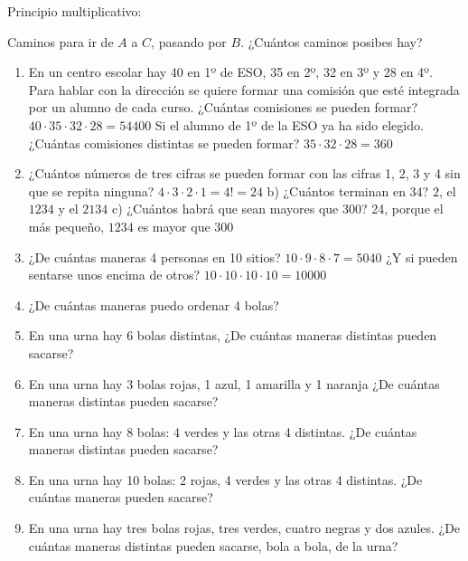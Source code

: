 Principio multiplicativo:

Caminos para ir de $A$ a $C$, pasando por $B$. ¿Cuántos caminos posibes hay? 

\begin{enumerate}
	\item En un centro escolar hay 40 en 1º de ESO, 35 en 2º, 32 en 3º y 28 en 4º. Para hablar con la dirección se quiere formar una comisión que esté integrada por un alumno de cada curso. ¿Cuántas comisiones se pueden formar?
	{$40·35·32·28=54400$}
	\subitem Si el alumno de 1º de la ESO ya ha sido elegido. ¿Cuántas comisiones distintas se pueden formar?
	{$35·32·28=360$}
	\item ¿Cuántos números de tres cifras se pueden formar con las cifras 1, 2, 3 y 4 sin que se repita ninguna? 
	{$4·3·2·1 = 4! = 24$}
		\subitem b) ¿Cuántos terminan en 34? 
		{$2$, el $1234$ y el $2134$}
		\subitem c) ¿Cuántos habrá que sean mayores que 300?
		{24, porque el más pequeño, $1234$ es mayor que 300}
	\item ¿De cuántas maneras 4 personas en 10 sitios?
	{$10·9·8·7 = 5040$}
	\subitem ¿Y si pueden sentarse unos encima de otros? 
	{$10·10·10·10 = 10000$}
	\item ¿De cuántas maneras puedo ordenar 4 bolas?
	\item En una urna hay 6 bolas distintas, ¿De cuántas maneras distintas pueden sacarse? 
	\item En una urna hay 3 bolas rojas, 1 azul, 1 amarilla y 1 naranja ¿De cuántas maneras distintas pueden sacarse? 
	\item En una urna hay 8 bolas: 4 verdes y las otras 4 distintas. ¿De cuántas maneras distintas pueden sacarse?
	\item En una urna hay 10 bolas: 2 rojas, 4 verdes y las otras 4 distintas. ¿De cuántas maneras pueden sacarse?
	\item En una urna hay tres bolas rojas, tres verdes, cuatro negras y dos azules. ¿De cuántas maneras distintas pueden sacarse, bola a bola, de la urna?


\end{enumerate}
